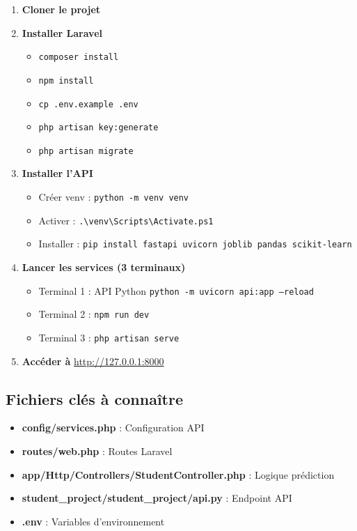 \documentclass[12pt,a4paper]{article}
\begin{document}
\begin{enumerate}
    \item \textbf{Cloner le projet}
    \item \textbf{Installer Laravel}
        \begin{itemize}
            \item \texttt{composer install}
            \item \texttt{npm install}
            \item \texttt{cp .env.example .env}
            \item \texttt{php artisan key:generate}
            \item \texttt{php artisan migrate}
        \end{itemize}
    \item \textbf{Installer l'API}
        \begin{itemize}
            \item Créer venv : \texttt{python -m venv venv}
            \item Activer : \texttt{.\textbackslash venv\textbackslash Scripts\textbackslash Activate.ps1}
            \item Installer : \texttt{pip install fastapi uvicorn joblib pandas scikit-learn}
        \end{itemize}
    \item \textbf{Lancer les services (3 terminaux)}
        \begin{itemize}
            \item Terminal 1 : API Python \texttt{python -m uvicorn api:app --reload}
            \item Terminal 2 : \texttt{npm run dev}
            \item Terminal 3 : \texttt{php artisan serve}
        \end{itemize}
    \item \textbf{Accéder à} \url{http://127.0.0.1:8000}
\end{enumerate}

\subsection{Fichiers clés à connaître}

\begin{itemize}
    \item \textbf{config/services.php} : Configuration API
    \item \textbf{routes/web.php} : Routes Laravel
    \item \textbf{app/Http/Controllers/StudentController.php} : Logique prédiction
    \item \textbf{student\_project/student\_project/api.py} : Endpoint API
    \item \textbf{.env} : Variables d'environnement
\end{itemize}
\end{document}
